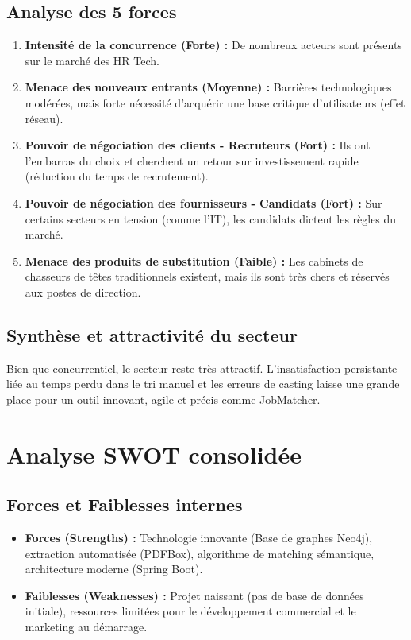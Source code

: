 \documentclass[12pt,a4paper]{report}
\begin{document}
\subsection{Analyse des 5 forces}
\begin{enumerate}
    \item \textbf{Intensité de la concurrence (Forte) :} De nombreux acteurs sont présents sur le marché des HR Tech.
    \item \textbf{Menace des nouveaux entrants (Moyenne) :} Barrières technologiques modérées, mais forte nécessité d'acquérir une base critique d'utilisateurs (effet réseau).
    \item \textbf{Pouvoir de négociation des clients - Recruteurs (Fort) :} Ils ont l'embarras du choix et cherchent un retour sur investissement rapide (réduction du temps de recrutement).
    \item \textbf{Pouvoir de négociation des fournisseurs - Candidats (Fort) :} Sur certains secteurs en tension (comme l'IT), les candidats dictent les règles du marché.
    \item \textbf{Menace des produits de substitution (Faible) :} Les cabinets de chasseurs de têtes traditionnels existent, mais ils sont très chers et réservés aux postes de direction.
\end{enumerate}

\subsection{Synthèse et attractivité du secteur}
Bien que concurrentiel, le secteur reste très attractif. L'insatisfaction persistante liée au temps perdu dans le tri manuel et les erreurs de casting laisse une grande place pour un outil innovant, agile et précis comme JobMatcher.

\section{Analyse SWOT consolidée}

\subsection{Forces et Faiblesses internes}
\begin{itemize}
    \item \textbf{Forces (Strengths) :} Technologie innovante (Base de graphes Neo4j), extraction automatisée (PDFBox), algorithme de matching sémantique, architecture moderne (Spring Boot).
    \item \textbf{Faiblesses (Weaknesses) :} Projet naissant (pas de base de données initiale), ressources limitées pour le développement commercial et le marketing au démarrage.
\end{itemize}
\end{document}
